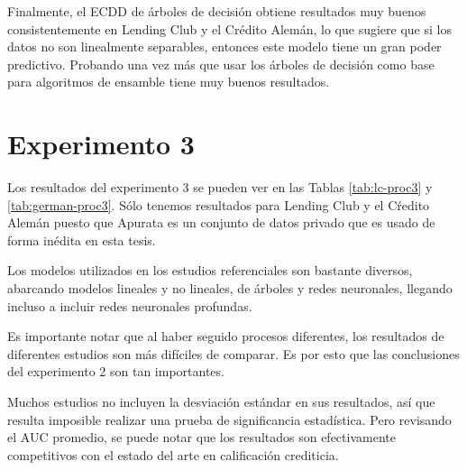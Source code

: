 Finalmente, el \ac{ECDD} de árboles de decisión obtiene resultados muy buenos consistentemente en Lending Club y el Crédito Alemán, lo que sugiere que si los datos no son linealmente separables, entonces este modelo tiene un gran poder predictivo. Probando una vez más que usar los árboles de decisión como base para algoritmos de ensamble tiene muy buenos resultados.



\section{Experimento 3} %

Los resultados del experimento 3 se pueden ver en las Tablas \ref{tab:lc-proc3} y \ref{tab:german-proc3}. Sólo tenemos resultados para Lending Club y el Cŕedito Alemán puesto que Apurata es un conjunto de datos privado que es usado de forma inédita en esta tesis.

Los modelos utilizados en los estudios referenciales son bastante diversos, abarcando modelos lineales y no lineales, de árboles y redes neuronales, llegando incluso a incluir redes neuronales profundas.

Es importante notar que al haber seguido procesos diferentes, los resultados de diferentes estudios son más difíciles de comparar. Es por esto que las conclusiones del experimento 2 son tan importantes.

Muchos estudios no incluyen la desviación estándar en sus resultados, así que resulta imposible realizar una prueba de significancia estadística. Pero revisando el \ac{AUC} promedio, se puede notar que los resultados son efectivamente competitivos con el estado del arte en calificación crediticia.


